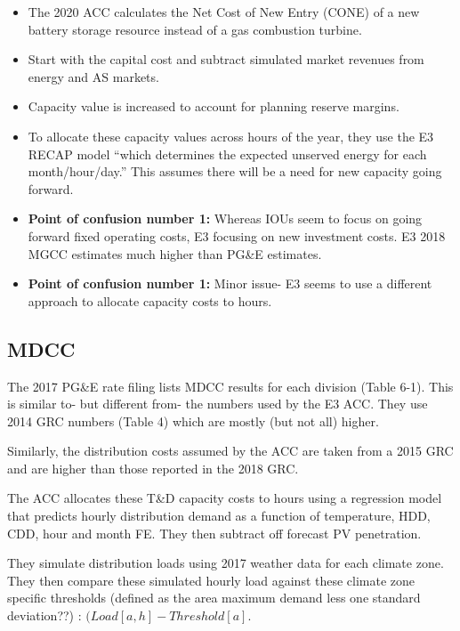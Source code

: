 \documentclass[11pt]{article}
\begin{document}
\begin{itemize}
\item The 2020 ACC calculates the Net Cost of New Entry (CONE) of a new battery storage resource instead of a gas combustion turbine.

\item Start with the capital cost and subtract simulated market revenues from energy and AS markets.

\item Capacity value is increased to account for planning reserve margins.

\item To allocate these capacity values across hours of the year, they use the E3 RECAP model ``which determines the expected unserved energy for each month/hour/day.'' This assumes there will be a need for new capacity going forward.

\item \textbf{Point of confusion number 1:} Whereas IOUs seem to focus on going forward fixed operating costs, E3 focusing on new investment costs. E3 2018 MGCC estimates much higher than PG&E estimates.

\item \textbf{Point of confusion number 1:} Minor issue- E3 seems to use a different approach to allocate capacity costs to hours.

\end{itemize}

\subsection{MDCC}


\item The 2017 PG&E rate filing lists MDCC results for each division (Table 6-1). This is similar to- but different from- the numbers used by the E3 ACC.  They use 2014 GRC numbers (Table 4)  which are mostly (but not all) higher.

\item Similarly, the distribution costs assumed by the ACC are taken from a 2015 GRC and are higher than those reported in the 2018 GRC.

\item The ACC allocates these T&D capacity costs to hours using a regression model that predicts hourly distribution demand as a function of temperature, HDD, CDD, hour and month FE. They then subtract off forecast PV penetration.

\item They simulate distribution loads using 2017 weather data for each climate zone.   They then compare these simulated hourly load against these climate zone specific thresholds (defined as the area maximum demand less one standard deviation??) : $(Load[a,h]-Threshold[a]$.
\end{document}
